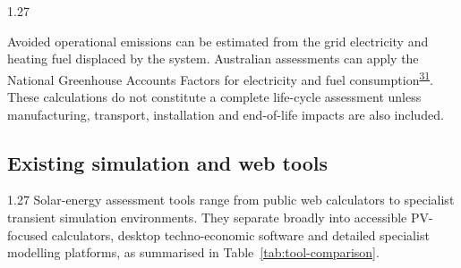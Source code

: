 \documentclass[12pt,letterpaper]{article}
\newcommand{\done}{\ \textcolor{green!45!black}{$\checkmark$}} %
\DeclareRobustCommand{\citenum}[1]{\hyperlink{ref:#1}{#1}} %
\begin{document}
\begin{spacing}{1.27}
\vspace{0.15in}

Avoided operational emissions can be estimated from the grid electricity and heating fuel displaced by the system. Australian assessments can apply the National Greenhouse Accounts Factors for electricity and fuel consumption\textsuperscript{\citenum{31}}. These calculations do not constitute a complete life-cycle assessment unless manufacturing, transport, installation and end-of-life impacts are also included.\par
\end{spacing}

\subsection[Existing simulation and web tools\done]{Existing simulation and web tools}\label{sec15}

\begin{spacing}{1.27}
Solar-energy assessment tools range from public web calculators to specialist transient simulation environments. They separate broadly into accessible PV-focused calculators, desktop techno-economic software and detailed specialist modelling platforms, as summarised in Table~\ref{tab:tool-comparison}.\par
\end{spacing}
\end{document}
